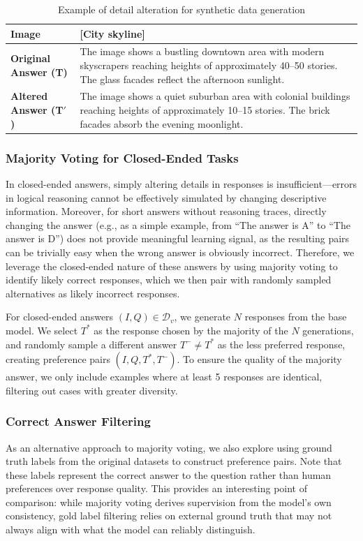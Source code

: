 \begin{table}[h]
\centering
\small
\begin{tabularx}{\columnwidth}{p{2.5cm}|X}
\hline
\textbf{Image} & [City skyline] \\
\hline
\textbf{Original Answer (T)} & The image shows a bustling downtown area with modern skyscrapers reaching heights of approximately 40--50 stories. The glass facades reflect the afternoon sunlight. \\
\hline
\textbf{Altered Answer (T$'$)} & The image shows a quiet suburban area with colonial buildings reaching heights of approximately 10--15 stories. The brick facades absorb the evening moonlight. \\
\hline
\end{tabularx}
\caption{Example of detail alteration for synthetic data generation}
\end{table}


\subsubsection{Majority Voting for Closed-Ended Tasks}
In closed-ended answers, simply altering details in responses is insufficient—errors in logical reasoning cannot be effectively simulated by changing descriptive information. Moreover, for short answers without reasoning traces, directly changing the answer (e.g., as a simple example, from ``The answer is A'' to ``The answer is D'') does not provide meaningful learning signal, as the resulting pairs can be trivially easy when the wrong answer is obviously incorrect. Therefore, we leverage the closed-ended nature of these answers by using majority voting to identify likely correct responses, which we then pair with randomly sampled alternatives as likely incorrect responses.

For closed-ended answers $(I, Q) \in \mathcal{D}_v$, we generate $N$ responses from the base model. We select $T^*$ as the response chosen by the majority of the $N$ generations, and randomly sample a different answer $T^- \neq T^*$ as the less preferred response, creating preference pairs $(I, Q, T^*, T^-)$. To ensure the quality of the majority answer, we only include examples where at least 5 responses are identical, filtering out cases with greater diversity.

\subsubsection{Correct Answer Filtering}
As an alternative approach to majority voting, we also explore using ground truth labels from the original datasets to construct preference pairs. Note that these labels represent the correct answer to the question rather than human preferences over response quality. This provides an interesting point of comparison: while majority voting derives supervision from the model's own consistency, gold label filtering relies on external ground truth that may not always align with what the model can reliably distinguish.

